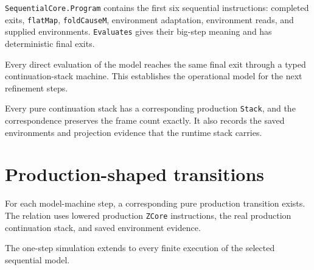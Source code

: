 \begin{definition}
\label{def:sequential-evaluation}
\leanok
\texttt{SequentialCore.Program} contains the first six sequential
instructions: completed exits, \texttt{flatMap}, \texttt{foldCauseM},
environment adaptation, environment reads, and supplied environments.
\texttt{Evaluates} gives their big-step meaning and has deterministic final
exits.
\end{definition}

\begin{theorem}
\label{thm:evaluation-machine}
\leanok
Every direct evaluation of the model reaches the same final exit through a
typed continuation-stack machine. This establishes the operational model for
the next refinement steps.
\end{theorem}

\begin{theorem}
\label{thm:stack-correspondence}
\leanok
Every pure continuation stack has a corresponding production \texttt{Stack},
and the correspondence preserves the frame count exactly. It also records the
saved environments and projection evidence that the runtime stack carries.
\end{theorem}

\section{Production-shaped transitions}

\begin{theorem}
\label{thm:sequential-step-refinement}
\leanok
For each model-machine step, a corresponding pure production transition
exists. The relation uses lowered production \texttt{ZCore} instructions,
the real production continuation stack, and saved environment evidence.
\end{theorem}

\begin{theorem}
\label{thm:sequential-steps-refinement}
\leanok
The one-step simulation extends to every finite execution of the selected
sequential model.
\end{theorem}

